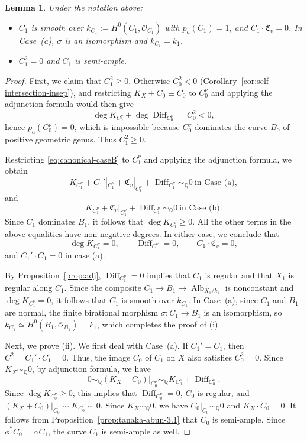 \documentclass[10pt,abstract=true]{scrartcl}
\numberwithin{equation}{section}
\newtheorem{lemma}[theorem]{Lemma}
\theoremstyle{definition}
\theoremstyle{remark}
\def\simQ{\sim_{\mathbb Q}} \def\geQ{\ge_{\mathbb Q}}
\DeclareMathOperator\Alb{Alb}
\begin{document}
\begin{lemma}\label{lemm:C1^2}
  Under the notation above:
  \begin{itemize}
    \item[\textup{(i)}] $C_1$ is smooth over $k_{C_1}:=H^0(C_1,\mathcal O_{C_1})$ with $p_a(C_1)=1$, and $C_1\cdot\mathfrak C_v=0$.
      In Case~(a), $\sigma$ is an isomorphism and $k_{C_1}=k_1$.
    \item[\textup{(ii)}] $C_1^2=0$ and $C_1$ is semi-ample.
  \end{itemize}
\end{lemma}
\begin{proof}
  First, we claim that $C_1^2\geq0$. Otherwise $C_0^2<0$ (Corollary~\ref{cor:self-intersection-insep}), and restricting $K_X+C_0\equiv C_0$ to $C_0^\nu$ and applying the adjunction formula would then give
  \[
    \deg K_{C_0^\nu}+\deg\operatorname{Diff}_{C_0^\nu}=C_0^2<0,
  \]
  hence $p_a(C_0^\nu)=0$, which is impossible because $C_0^\nu$ dominates the curve $B_0$ of positive geometric genus.
  Thus $C_1^2\geq0$.

  Restricting \eqref{eq:canonical-caseB} to $C_1^\nu$ and applying the adjunction formula, we obtain
  \[
  K_{C_1^\nu}+C_1'|_{C_1^\nu}+\mathfrak C_v|_{C_1^\nu}
  +\operatorname{Diff}_{C_1^\nu}\simQ0 ~\text{in Case~(a)},
  \]
  and 
  \[
  K_{C_1^\nu}+\mathfrak C_v|_{C_1^\nu}
  +\operatorname{Diff}_{C_1^\nu}\simQ0  ~\text{in Case~(b)}.
  \]
  Since $C_1$ dominates $B_1$, it follows that $\deg K_{C_1^\nu}\geq0$. All the other terms in the above equalities have non-negative degrees.
  In either case, we conclude that
  \[
    \deg K_{C_1^\nu}=0,\qquad \operatorname{Diff}_{C_1^\nu}=0,
    \qquad C_1\cdot\mathfrak C_v=0,
  \]
  and $C_1'\cdot C_1=0$ in case (a).

  By Proposition~\ref{prop:adj}, $\operatorname{Diff}_{C_1^\nu}=0$ implies that $C_1$ is regular and that $X_1$ is regular along $C_1$.
  Since the composite $C_1\to B_1\to\Alb_{X_1/k_1}$ is nonconstant and $\deg K_{C_1^\nu}=0$, it follows that $C_1$ is smooth over $k_{C_1}$.
  In Case~(a), since $C_1$ and $B_1$ are normal, the finite birational morphism $\sigma\colon C_1\to B_1$ is an isomorphism, so $k_{C_1}\simeq H^0(B_1,\mathcal O_{B_1})=k_1$, which completes the proof of (i).

  \smallskip
  Next, we prove (ii).
  We first deal with Case~(a). If $C_1'=C_1$, then $C_1^2= C_1'\cdot C_1=0$.
  Thus, the image $C_0$ of $C_1$ on $X$ also satisfies $C_0^2=0$. Since $K_X\simQ0$, by adjunction formula, we have 
  \[
   0\simQ (K_X+C_0)|_{C_0^\nu}\simQ K_{C_0^\nu}+\operatorname{Diff}_{C_0^\nu}.
  \]
  Since $\deg K_{C_0^\nu}\ge 0$, this implies that $\operatorname{Diff}_{C_0^\nu}=0$, $C_0$ is regular, and $(K_X+C_0)|_{C_0}\sim K_{C_0}\sim0$.
  Since $K_X\simQ0$, we have $C_0|_{C_0}\simQ0$ and $K_{X}\cdot C_0=0$.
  It follows from Proposition~\ref{prop:tanaka-abun-3.1} that $C_0$ is semi-ample.
  Since $\phi^*C_0 = \alpha C_1$, the curve $C_1$ is semi-ample as well.


\end{proof}
\end{document}
